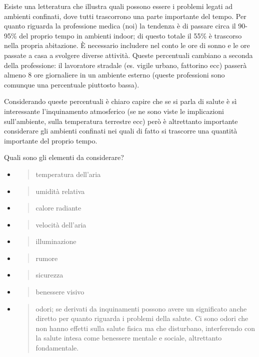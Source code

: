 \documentclass[]{article}
\begin{document}
Esiste una letteratura che illustra quali possono essere i problemi
legati ad ambienti confinati, dove tutti trascorrono una parte
importante del tempo. Per quanto riguarda la professione medica (noi) la
tendenza è di passare circa il 90-95\% del proprio tempo in ambienti
indoor; di questo totale il 55\% è trascorso nella propria abitazione. È
necessario includere nel conto le ore di sonno e le ore passate a casa a
svolgere diverse attività. Queste percentuali cambiano a seconda della
professione: il lavoratore stradale (es. vigile urbano, fattorino ecc)
passerà almeno 8 ore giornaliere in un ambiente esterno (queste
professioni sono comunque una percentuale piuttosto bassa).

Considerando queste percentuali è chiaro capire che se si parla di
salute è sì interessante l'inquinamento atmosferico (se ne sono viste le
implicazioni sull'ambiente, sulla temperatura terrestre ecc) però è
altrettanto importante considerare gli ambienti confinati nei quali di
fatto si trascorre una quantità importante del proprio tempo.

Quali sono gli elementi da considerare?

\begin{itemize}
\item
  \begin{quote}
  temperatura dell'aria
  \end{quote}
\item
  \begin{quote}
  umidità relativa
  \end{quote}
\item
  \begin{quote}
  calore radiante
  \end{quote}
\item
  \begin{quote}
  velocità dell'aria
  \end{quote}
\item
  \begin{quote}
  illuminazione
  \end{quote}
\item
  \begin{quote}
  rumore
  \end{quote}
\item
  \begin{quote}
  sicurezza
  \end{quote}
\item
  \begin{quote}
  benessere visivo
  \end{quote}
\item
  \begin{quote}
  odori; se derivati da inquinamenti possono avere un significato anche
  diretto per quanto riguarda i problemi della salute. Ci sono odori che
  non hanno effetti sulla salute fisica ma che disturbano, interferendo
  con la salute intesa come benessere mentale e sociale, altrettanto
  fondamentale.
  \end{quote}
\end{itemize}
\end{document}

